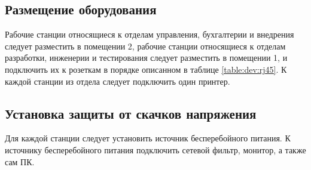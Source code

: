 \subsection{Размещение оборудования}

Рабочие станции относящиеся к отделам управления, бухгалтерии и внедрения следует разместить в помещении 2, 
рабочие станции относящиеся к отделам разработки, инженерии и тестирования следует разместить в помещении 1, 
и подключить их к розеткам в порядке описанном в таблице \ref{table:dev:rj45}. К каждой станции из отдела следует 
подключить один принтер.

\subsection{Установка защиты от скачков напряжения}

Для каждой станции следует установить источник бесперебойного питания. К источнику бесперебойного питания подключить сетевой 
фильтр, монитор, а также сам ПК.
